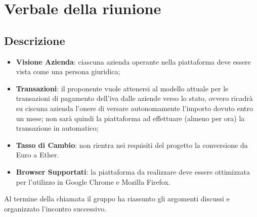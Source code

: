 \section{Verbale della riunione}

\subsection{Descrizione}

\begin{itemize}
	\item \textbf{Visione Azienda}: ciascuna azienda operante nella piattaforma deve essere vista come una persona giuridica;
	\item \textbf{Transazioni}: il proponente vuole attenersi al modello attuale per le transazioni di pagamento dell'iva dalle aziende verso lo stato, ovvero ricadrà su ciscuna azienda l'onere di versare autonomamente l'importo dovuto entro un mese; non sarà quindi la piattaforma ad effettuare (almeno per ora) la transazione in automatico;
	\item \textbf{Tasso di Cambio}: non rientra nei requisiti del progetto la conversione da Euro a Ether.
	\item \textbf{Browser Supportati}: la piattaforma da realizzare deve essere ottimizzata per l'utilizzo in Google Chrome e Mozilla Firefox.

\end{itemize}
Al termine della chiamata il gruppo ha riassunto gli argomenti discussi e organizzato l'incontro successivo.
